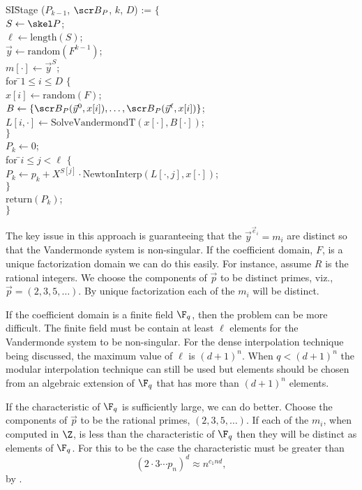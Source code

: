 \begindsacode
SI\=Stage ($P_{k-1}$, ${\scr B}_P$, $k$, $D$) := $\{$ \\
\> $S \leftarrow \skel P$; \\
\> $\ell \leftarrow \mbox{length}(S)$; \\
\> $\vec{y} \leftarrow \mbox{random}(F^{k-1})$; \\
\> $m[\cdot] \leftarrow \vec{y}^S$; \\
\> for \=$1 \le i \le D$ $\{$ \\
\>\> $x[i] \leftarrow \mbox{random}(F)$; \\
\>\> $B \leftarrow \{{\scr B}_P(\vec{y}^0, x[i]), \ldots, 
  {\scr B}_P(\vec{y}^{\ell}, x[i])\}$; \\
\>\> $L[i, \cdot] \leftarrow \mbox{SolveVandermondT}(x[\cdot], B[\cdot])$;\\
\>\> $\}$ \\
\> $P_k \leftarrow 0$; \\
\> for \=$i \le j < \ell$ $\{$\\
\> $P_k \leftarrow p_k + X^{S[j]} \cdot \mbox{NewtonInterp}(L[\cdot,
j], x[\cdot])$;\\
\>\> $\}$ \\
\> $\mbox{return}(P_k)$; \\
\> $\}$
\enddsacode

The key issue in this approach is guaranteeing that the
$\vec{y}^{\vec{e}_i} = m_i$ are distinct so that the Vandermonde
system is non-singular.  If the coefficient domain, $F$, is a unique
factorization domain we can do this easily.  For instance, assume $R$
is the rational integers.  We choose the components of $\vec p$ to be
distinct primes, viz., $\vec p = (2, 3, 5, \ldots)$.  By unique
factorization each of the $m_i$ will be distinct.

If the coefficient domain is a finite field $\F_q$, then the problem
can be more difficult.  The finite field must be contain at least
$\ell$ elements for the Vandermonde system to be non-singular.  For
the dense interpolation technique being discussed, the maximum value
of $\ell$ is $(d+1)^n$.  When $q < (d+1)^n$ the modular interpolation
technique can still be used but elements should be chosen from an
algebraic extension of $\F_q$ that has more than $(d+1)^n$ elements.

If the characteristic of $\F_q$ is sufficiently large, we can do better.  
Choose the components of $\vec p$ to be the rational primes, $(2, 3, 5,
\ldots)$.  If each of the $m_i$, when computed in $\Z$, is less than the
characteristic of $\F_q$ then they will be distinct as elements of
$\F_q$.  For this to be the case the characteristic must be greater than
\[
(2 \cdot 3 \cdots p_n)^d \approx n^{c_1 nd},
\]
by .

